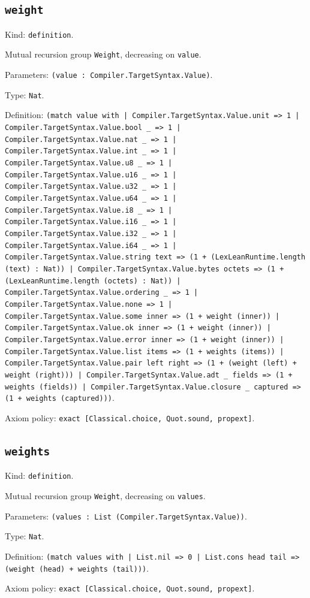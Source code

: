 \documentclass[11pt]{article}
\begin{document}
\subsection*{\texttt{weight}}
\noindent Kind: \texttt{definition}.\par
\noindent Mutual recursion group \texttt{Weight}, decreasing on \texttt{value}.\par
\noindent Parameters: \texttt{(value : Compiler.TargetSyntax.Value)}.\par
\noindent Type: \texttt{Nat}.\par
\noindent Definition: \texttt{(match value with | Compiler.TargetSyntax.Value.unit => 1 | Compiler.TargetSyntax.Value.bool \_ => 1 | Compiler.TargetSyntax.Value.nat \_ => 1 | Compiler.TargetSyntax.Value.int \_ => 1 | Compiler.TargetSyntax.Value.u8 \_ => 1 | Compiler.TargetSyntax.Value.u16 \_ => 1 | Compiler.TargetSyntax.Value.u32 \_ => 1 | Compiler.TargetSyntax.Value.u64 \_ => 1 | Compiler.TargetSyntax.Value.i8 \_ => 1 | Compiler.TargetSyntax.Value.i16 \_ => 1 | Compiler.TargetSyntax.Value.i32 \_ => 1 | Compiler.TargetSyntax.Value.i64 \_ => 1 | Compiler.TargetSyntax.Value.string text => (1 + (LexLeanRuntime.length (text) : Nat)) | Compiler.TargetSyntax.Value.bytes octets => (1 + (LexLeanRuntime.length (octets) : Nat)) | Compiler.TargetSyntax.Value.ordering \_ => 1 | Compiler.TargetSyntax.Value.none => 1 | Compiler.TargetSyntax.Value.some inner => (1 + weight (inner)) | Compiler.TargetSyntax.Value.ok inner => (1 + weight (inner)) | Compiler.TargetSyntax.Value.error inner => (1 + weight (inner)) | Compiler.TargetSyntax.Value.list items => (1 + weights (items)) | Compiler.TargetSyntax.Value.pair left right => (1 + (weight (left) + weight (right))) | Compiler.TargetSyntax.Value.adt \_ fields => (1 + weights (fields)) | Compiler.TargetSyntax.Value.closure \_ captured => (1 + weights (captured)))}.\par
\noindent Axiom policy: \texttt{exact [Classical.choice, Quot.sound, propext]}.\par
\subsection*{\texttt{weights}}
\noindent Kind: \texttt{definition}.\par
\noindent Mutual recursion group \texttt{Weight}, decreasing on \texttt{values}.\par
\noindent Parameters: \texttt{(values : List (Compiler.TargetSyntax.Value))}.\par
\noindent Type: \texttt{Nat}.\par
\noindent Definition: \texttt{(match values with | List.nil => 0 | List.cons head tail => (weight (head) + weights (tail)))}.\par
\noindent Axiom policy: \texttt{exact [Classical.choice, Quot.sound, propext]}.\par
\end{document}
